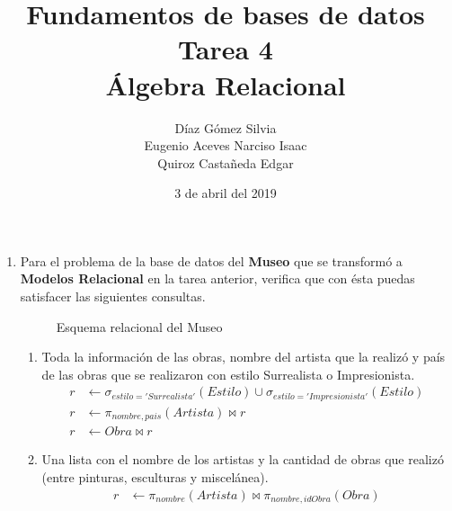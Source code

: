 \documentclass{article}
\begin{document}
    \title{
        Fundamentos de bases de datos \\
        Tarea 4 \\
        Álgebra Relacional
    }
    \author{
        Díaz Gómez Silvia \\
        Eugenio Aceves Narciso Isaac \\
        Quiroz Castañeda Edgar
    }
    \date {
        3 de abril del 2019    
    }
    \maketitle

    \begin{enumerate}
        \item {
            Para el problema de la base de datos del \textbf{Museo} que se
            transformó a \textbf{Modelos Relacional} en la tarea anterior,
            verifica que con ésta puedas satisfacer las siguientes consultas.
            \begin{figure}[H]
                \centering
                \caption{Esquema relacional del Museo}
            \end{figure}
            \begin{enumerate}
                \item {
                    Toda la información de las obras, nombre del artista que la
                    realizó y país de las obras que se realizaron con estilo
                    Surrealista o Impresionista.
                    \begin{align*}
                        r &\leftarrow \sigma_{estilo = 'Surrealista'}(Estilo) 
                        \cup \sigma_{estilo = 'Impresionista'}(Estilo) \\
                        r &\leftarrow \pi_{nombre, pais}(Artista) \bowtie r \\
                        r &\leftarrow Obra \bowtie r
                    \end{align*}
                }
                \item {
                    Una lista con el nombre de los artistas y la cantidad de
                    obras que realizó (entre pinturas, esculturas y miscelánea).
                    \begin{align*}
                        r &\leftarrow \pi_{nombre}(Artista) \bowtie \pi_{nombre, 
                        idObra}(Obra) \\

\end{align*}}
\end{enumerate}}
\end{enumerate}
\end{document}
